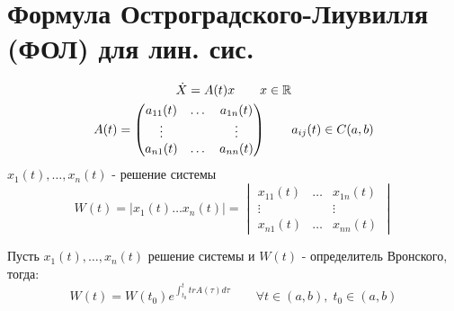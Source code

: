 \documentclass{article}
\begin{document}
\section{Формула Остроградского-Лиувилля (ФОЛ) для лин. сис.}

\begin{gather*}
  \dot{X}=A(t)x \qquad x\in \mathbb{R} \\
  A(t)= \begin{pmatrix}
     a_{11}(t) & \dots & a_{1n}(t) \\ 
     \vdots & & \vdots \\ 
     a_{n1}(t) & \dots & a_{nn}(t)
  \end{pmatrix} \qquad a_{ij}(t) \in C(a,b)
\end{gather*}
$x_1(t),\dots, x_n(t)$ - решение системы
\[
  W(t) = |x_1(t) \dots x_n(t)| = \begin{vmatrix}
     x_{11}(t) & \dots & x_{1n}(t) \\ 
     \vdots & & \vdots \\ 
     x_{n1}(t) & \dots & x_{nn}(t)
  \end{vmatrix}
\]
\begin{theorem}
  Пусть $x_1(t),\dots,x_n(t)$ решение системы и $W(t)$ - определитель Вронского,
  тогда:
  \[
    W(t)=W(t_0)e^{\int_{t_0}^{t}trA(\tau)d\tau} \qquad \forall t \in (a,b), \; t_0 \in (a,b)
  \]
\end{theorem}
\end{document}

